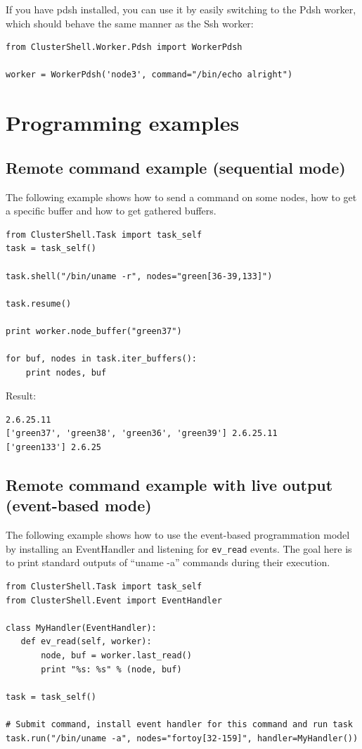 \documentclass[english,a4paper]{csuserguide}
\begin{document}
\pagebreak[2]

If you have pdsh installed, you can use it by easily switching to the Pdsh worker, which should behave the same manner as the Ssh worker:
\medskip
\begin{lstlisting}[breaklines=true, breakatwhitespace=true]
from ClusterShell.Worker.Pdsh import WorkerPdsh

worker = WorkerPdsh('node3', command="/bin/echo alright")
\end{lstlisting}


\newpage

\section{Programming examples}

\subsection{Remote command example (sequential mode)}

The following example shows how to send a command on some nodes, how to get a specific buffer and how to get gathered buffers.
\medskip
\begin{lstlisting}[breaklines=true, breakatwhitespace=true]
from ClusterShell.Task import task_self
task = task_self()

task.shell("/bin/uname -r", nodes="green[36-39,133]")

task.resume()

print worker.node_buffer("green37")

for buf, nodes in task.iter_buffers():
	print nodes, buf

\end{lstlisting}

Result:
\begin{verbatim}
2.6.25.11
['green37', 'green38', 'green36', 'green39'] 2.6.25.11
['green133'] 2.6.25
\end{verbatim}

\subsection{Remote command example with live output (event-based mode)}

The following example shows how to use the event-based programmation model by installing an EventHandler and listening for \lstinline+ev_read+ events. The goal here is to print standard outputs of ``uname -a'' commands during their execution.
\medskip
\begin{lstlisting}[breaklines=true, breakatwhitespace=true]
from ClusterShell.Task import task_self
from ClusterShell.Event import EventHandler

class MyHandler(EventHandler):
   def ev_read(self, worker):
       node, buf = worker.last_read()
       print "%s: %s" % (node, buf)

task = task_self()

# Submit command, install event handler for this command and run task
task.run("/bin/uname -a", nodes="fortoy[32-159]", handler=MyHandler())
\end{lstlisting}
\end{document}
